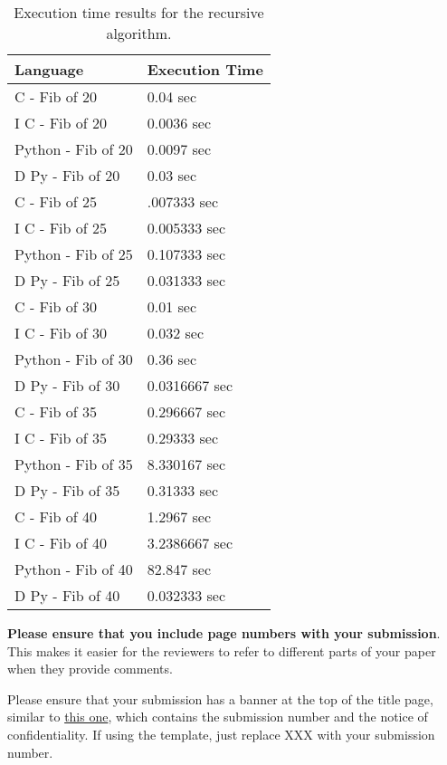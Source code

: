 \documentclass{sig-alternate}
\begin{document}
\begin{scriptsize}
\begin{table}[h!]
  \centering
  \begin{tabular}{|l|l|}
    \hline
    \textbf{Language} & \textbf{Execution Time}\\
    \hline
    C - Fib of 20 & 0.04 sec\\
    \hline
	I C - Fib of 20 & 0.0036 sec\\
	\hline
    Python - Fib of 20 & 0.0097 sec\\
    \hline
    D Py - Fib of 20 & 0.03 sec\\
    \hline
    C - Fib of 25 & .007333 sec\\
    \hline
	I C - Fib of 25 & 0.005333 sec\\
	\hline
	Python - Fib of 25 & 0.107333 sec\\
	\hline
    D Py - Fib of 25 & 0.031333 sec\\
    \hline
    C - Fib of 30 & 0.01 sec\\
	\hline
	I C - Fib of 30 & 0.032 sec\\
	\hline
	Python - Fib of 30 & 0.36 sec\\
	\hline
	D Py - Fib of 30 & 0.0316667 sec\\
	\hline
	C - Fib of 35 & 0.296667 sec\\
	\hline
	I C - Fib of 35 & 0.29333 sec\\
	\hline
	Python - Fib of 35 & 8.330167 sec\\
	\hline
	D Py - Fib of 35 & 0.31333 sec\\
	\hline
	C - Fib of 40 & 1.2967 sec\\
	\hline
	I C - Fib of 40 & 3.2386667 sec\\
	\hline
	Python - Fib of 40 & 82.847 sec\\
	\hline
	D Py - Fib of 40 & 0.032333 sec\\
    \hline
  \end{tabular}
  \caption{Execution time results for the recursive algorithm.}
  \label{table:formatting}
\end{table}
\end{scriptsize}

\textbf{Please ensure that you include page numbers with your
submission}. This makes it easier for the reviewers to refer to different
parts of your paper when they provide comments.

Please ensure that your submission has a banner at the top of the
title page, similar to
\href{http://hpca2018.ece.ucsb.edu/docs/hpca24.pdf}{this one},
which contains the submission number and the notice of
confidentiality.  If using the template, just replace XXX with your
submission number.
\end{document}
